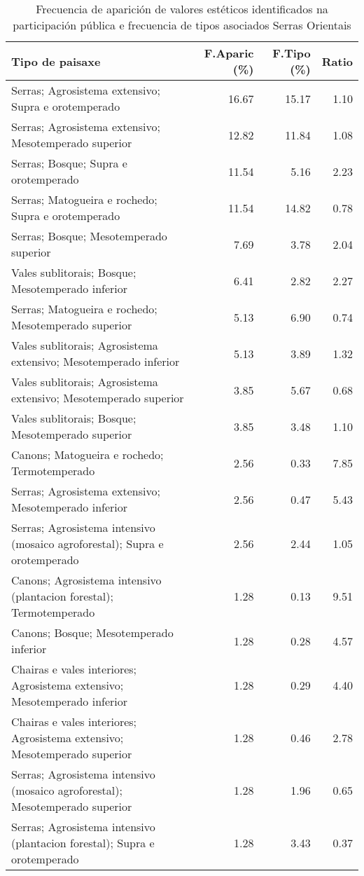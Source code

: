\begin{table}[p]
\centering
\caption{Frecuencia de aparición de valores estéticos identificados na participación pública e frecuencia de tipos asociados Serras Orientais} 
\label{vsixotest5}
\begin{tabular}{lrrr}
  \hline
Tipo de paisaxe & F.Aparic (\%) & F.Tipo (\%) & Ratio \\ 
  \hline
Serras; Agrosistema extensivo; Supra e orotemperado & 16.67 & 15.17 & 1.10 \\ 
  Serras; Agrosistema extensivo; Mesotemperado superior & 12.82 & 11.84 & 1.08 \\ 
  Serras; Bosque; Supra e orotemperado & 11.54 & 5.16 & 2.23 \\ 
  Serras; Matogueira e rochedo; Supra e orotemperado & 11.54 & 14.82 & 0.78 \\ 
  Serras; Bosque; Mesotemperado superior & 7.69 & 3.78 & 2.04 \\ 
  Vales sublitorais; Bosque; Mesotemperado inferior & 6.41 & 2.82 & 2.27 \\ 
  Serras; Matogueira e rochedo; Mesotemperado superior & 5.13 & 6.90 & 0.74 \\ 
  Vales sublitorais; Agrosistema extensivo; Mesotemperado inferior & 5.13 & 3.89 & 1.32 \\ 
  Vales sublitorais; Agrosistema extensivo; Mesotemperado superior & 3.85 & 5.67 & 0.68 \\ 
  Vales sublitorais; Bosque; Mesotemperado superior & 3.85 & 3.48 & 1.10 \\ 
  Canons; Matogueira e rochedo; Termotemperado & 2.56 & 0.33 & 7.85 \\ 
  Serras; Agrosistema extensivo; Mesotemperado inferior & 2.56 & 0.47 & 5.43 \\ 
  Serras; Agrosistema intensivo (mosaico agroforestal); Supra e orotemperado & 2.56 & 2.44 & 1.05 \\ 
  Canons; Agrosistema intensivo (plantacion forestal); Termotemperado & 1.28 & 0.13 & 9.51 \\ 
  Canons; Bosque; Mesotemperado inferior & 1.28 & 0.28 & 4.57 \\ 
  Chairas e vales interiores; Agrosistema extensivo; Mesotemperado inferior & 1.28 & 0.29 & 4.40 \\ 
  Chairas e vales interiores; Agrosistema extensivo; Mesotemperado superior & 1.28 & 0.46 & 2.78 \\ 
  Serras; Agrosistema intensivo (mosaico agroforestal); Mesotemperado superior & 1.28 & 1.96 & 0.65 \\ 
  Serras; Agrosistema intensivo (plantacion forestal); Supra e orotemperado & 1.28 & 3.43 & 0.37 \\ 
   \hline
\end{tabular}
\end{table}
